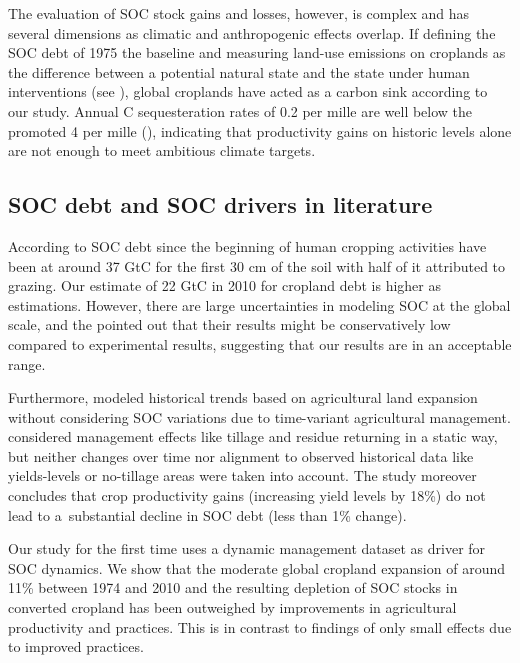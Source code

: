 \documentclass[gc, manuscript]{copernicus}
\begin{document}
The evaluation of SOC stock gains and losses, however, is complex and has several dimensions as climatic and anthropogenic effects overlap. If defining the SOC debt of 1975 the baseline and measuring land-use emissions on croplands as the difference between a potential natural state and the state under human interventions (see \citep{pugh_simulated_2015}), global croplands have acted as a carbon sink according to our study. Annual C sequesteration rates of 0.2 per mille are well below the promoted 4 per mille (\citep{minasny_soil_2017}), indicating that productivity gains on historic levels alone are not enough to meet ambitious climate targets.

\hypertarget{soc-debt-and-soc-drivers-in-literature}{%
\subsection{SOC debt and SOC drivers in literature}\label{soc-debt-and-soc-drivers-in-literature}}

According to \citep{sanderman_soil_2017} SOC debt since the beginning of human cropping activities have been at around 37 GtC for the first 30 cm of the soil with half of it attributed to grazing. Our estimate of 22 GtC in 2010 for cropland debt is higher as \citep{sanderman_soil_2017} estimations. However, there are large uncertainties in modeling SOC at the global scale, and the \citep{sanderman_soil_2017} pointed out that their results might be conservatively low compared to experimental results, suggesting that our results are in an acceptable range.

Furthermore, \citep{sanderman_soil_2017} modeled historical trends based on agricultural land expansion without considering SOC variations due to time-variant agricultural management. \citep{pugh_simulated_2015} considered management effects like tillage and residue returning in a static way, but neither changes over time nor alignment to observed historical data like yields-levels or no-tillage areas were taken into account. The study moreover concludes that crop productivity gains (increasing yield levels by 18\%) do not lead to a~substantial decline in SOC debt (less than 1\% change).

Our study for the first time uses a dynamic management dataset as driver for SOC dynamics. We show that the moderate global cropland expansion of around 11\% between 1974 and 2010 and the resulting depletion of SOC stocks in converted cropland has been outweighed by improvements in agricultural productivity and practices. This is in contrast to \citep{pugh_simulated_2015} findings of only small effects due to improved practices.
\end{document}
